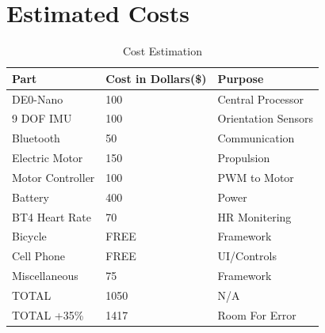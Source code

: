 \documentclass[12pt,article]{IEEEtran}
\begin{document}
\section{\bfseries Estimated Costs}
    \begin{table}[H]
        \renewcommand{\arraystretch}{1.3}
            \caption{Cost Estimation}
            
            \label{Team Hour Summary}
            
            \centering
            \begin{tabular}{p{3cm}|p{1.5cm}|p{3cm}}
            \hline
            \bfseries   Part                & \bfseries Cost in Dollars(\$) & \bfseries Purpose     \\
            \hline\hline
                        DE0-Nano            & 100                           &   Central Processor   \\
                        9 DOF IMU           & 100                           &   Orientation Sensors \\  
                        Bluetooth           & 50                            &   Communication       \\  
                        Electric Motor      & 150                           &   Propulsion          \\
                        Motor Controller    & 100                           &   PWM to Motor        \\
                        Battery             & 400                           &   Power               \\  
                        BT4 Heart Rate      & 70                            &   HR Monitering       \\  
                        Bicycle             & FREE                          &   Framework           \\
                        Cell Phone          & FREE                          &   UI/Controls         \\
                        Miscellaneous       & 75                            &   Framework           \\
                        TOTAL               & 1050                          &   N/A                 \\        
                        \hline
                        TOTAL +35\%         & 1417                          &   Room For Error      \\        
                        \hline
            \end{tabular}
        \end{table}








\end{document}
